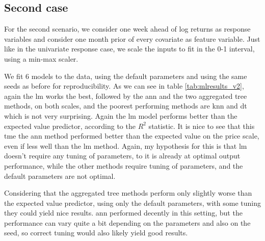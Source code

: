 \subsection{Second case}
For the second scenario, we consider one week ahead of log returns as response variables and consider one month prior of every covariate as feature variable.
Just like in the univariate response case, we scale the inputs to fit in the 0-1 interval, using a min-max scaler.



We fit 6 models to the data, using the default parameters and using the same seeds as before for reproducibility.
As we can see in table \ref{tab:mlresults_v2}, again the \acrshort{lm} works the best, followed by the \acrshort{ann} and the two aggregated tree methods, on both scales, and the poorest performing methods are \acrshort{knn} and \acrshort{dt} which is not very surprising. Again the \acrshort{lm} model performs better than the expected value predictor, according to the $R^2$ statistic. It is nice to see that this tme the \acrshort{ann} method performed better than the expected value on the price scale, even if less well than the \acrshort{lm} method. Again, my hypothesis for this is that \acrshort{lm} doesn't require any tuning of parameters, to it is already at optimal output performance, while the other methods require tuning of parameters, and the default parameters are not optimal.

Considering that the aggregated tree methods perform only slightly worse than the expected value predictor, using only the default parameters,  with some tuning they could yield nice results. \acrshort{ann} performed decently in this setting, but the performance can vary quite a bit depending on the parameters and also on the seed, so correct tuning would also likely yield good results.

